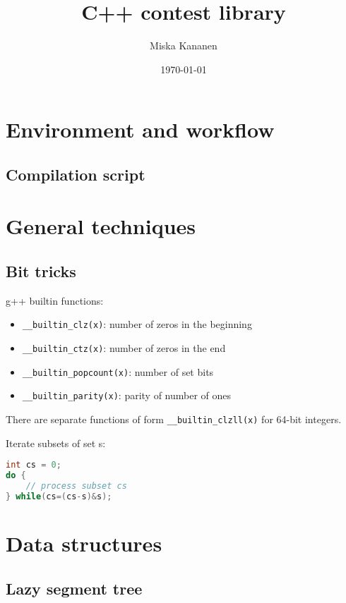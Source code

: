 \documentclass{article}
\begin{document}
\title{C++ contest library}
\author{Miska Kananen}
\date{\today}
\maketitle 

\tableofcontents

\section{Environment and workflow}
\subsection{Compilation script}


\section{General techniques}
\subsection{Bit tricks}

g++ builtin functions:
\begin{itemize}
	\item \verb|__builtin_clz(x)|: number of zeros in the beginning
	\item \verb|__builtin_ctz(x)|: number of zeros in the end
	\item \verb|__builtin_popcount(x)|: number of set bits
	\item \verb|__builtin_parity(x)|: parity of number of ones
\end{itemize}

There are separate functions of form \verb|__builtin_clzll(x)| for 64-bit integers.

Iterate subsets of set s:
\begin{lstlisting}[language=C++]
int cs = 0;
do {
	// process subset cs
} while(cs=(cs-s)&s);
\end{lstlisting}

\section{Data structures}

\subsection{Lazy segment tree}
\end{document}
